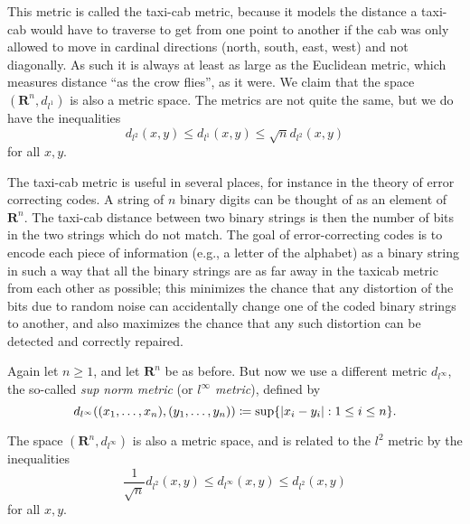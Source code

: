 \begin{note}
    This metric is called the taxi-cab metric, because it models the distance a taxi-cab would have to traverse to get from one point to another if the cab was only allowed to move in cardinal directions (north, south, east, west) and not diagonally.
    As such it is always at least as large as the Euclidean metric, which measures distance ``as the crow flies'', as it were.
    We claim that the space \((\mathbf{R}^n, d_{l^1})\) is also a metric space.
    The metrics are not quite the same, but we do have the inequalities
    \[
        d_{l^2}(x, y) \leq d_{l^1}(x, y) \leq \sqrt{n} d_{l^2}(x, y)
    \]
    for all \(x, y\).
\end{note}

\begin{remark}\label{1.1.8}
    The taxi-cab metric is useful in several places, for instance in the theory of error correcting codes.
    A string of \(n\) binary digits can be thought of as an element of \(\mathbf{R}^n\).
    The taxi-cab distance between two binary strings is then the number of bits in the two strings which do not match.
    The goal of error-correcting codes is to encode each piece of information (e.g., a letter of the alphabet) as a binary string in such a way that all the binary strings are as far away in the taxicab metric from each other as possible;
    this minimizes the chance that any distortion of the bits due to random noise can accidentally change one of the coded binary strings to another, and also maximizes the chance that any such distortion can be detected and correctly repaired.
\end{remark}

\begin{example}\label{1.1.9}
    Again let \(n \geq 1\), and let \(\mathbf{R}^n\) be as before.
    But now we use a different metric \(d_{l^\infty}\), the so-called \emph{sup norm metric} (or \emph{\(l^\infty\) metric}), defined by
    \[
        d_{l^\infty} ((x_1, \dots, x_n), (y_1, \dots, y_n)) \coloneqq \sup\{\abs*{x_i - y_i} : 1 \leq i \leq n\}.
    \]
\end{example}

\begin{note}
    The space \((\mathbf{R}^n, d_{l^\infty})\) is also a metric space, and is related to the \(l^2\) metric by the inequalities
    \[
        \frac{1}{\sqrt{n}} d_{l^2}(x, y) \leq d_{l^\infty}(x, y) \leq d_{l^2}(x, y)
    \]
    for all \(x, y\).
\end{note}

